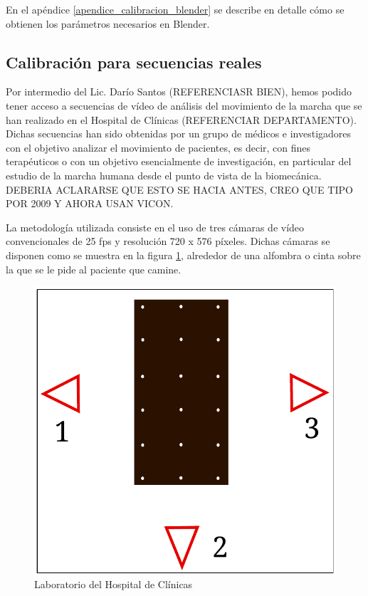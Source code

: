 En el apéndice \ref{apendice_calibracion_blender} se describe en detalle cómo se obtienen los parámetros necesarios en Blender.\\

\subsection{Calibración para secuencias reales}

Por intermedio del Lic. Darío Santos (REFERENCIASR BIEN), hemos podido tener acceso a secuencias de vídeo de análisis del movimiento de la marcha que se han realizado en el Hospital de Clínicas (REFERENCIAR DEPARTAMENTO). Dichas secuencias han sido obtenidas por un grupo de médicos e investigadores con el objetivo analizar el movimiento de pacientes, es decir, con fines terapéuticos o con un objetivo esencialmente de investigación, en particular del estudio de la marcha humana desde el punto de vista de la biomecánica.\\

DEBERIA ACLARARSE QUE ESTO SE HACIA ANTES, CREO QUE TIPO POR 2009 Y AHORA USAN VICON.

La metodología utilizada consiste en el uso de tres cámaras de vídeo convencionales de 25 fps y resolución  720 x 576 píxeles. Dichas cámaras se disponen como se muestra en la figura \ref{fig: lab_real}, alrededor de una alfombra o cinta sobre la que se le pide al paciente que camine.


\begin{figure}[ht]
\begin{center}
\includegraphics[scale=0.5]{img/calibracion/lab_real.pdf}
\end{center}
\caption{Laboratorio del Hospital de Clínicas}
\label{fig: lab_real}
\end{figure}

